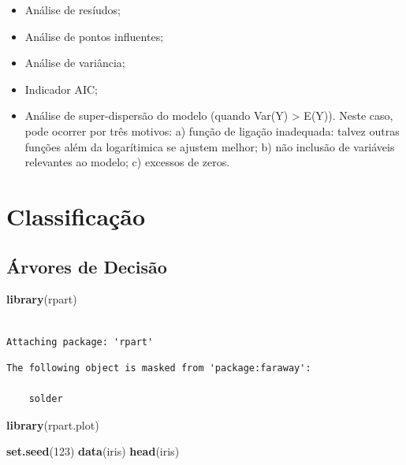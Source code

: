 \documentclass[12pt,brazil,oneside]{book}
\newenvironment{Shaded}{\begin{snugshade}}{\end{snugshade}}
\newcommand{\DecValTok}[1]{\textcolor[rgb]{0.00,0.00,0.81}{#1}}
\newcommand{\KeywordTok}[1]{\textcolor[rgb]{0.13,0.29,0.53}{\textbf{#1}}}
\newcommand{\NormalTok}[1]{#1}
\providecommand{\tightlist}{%
  \setlength{\itemsep}{0pt}\setlength{\parskip}{0pt}}
\begin{document}
\begin{itemize}
\tightlist
\item
  Análise de resíudos;
\item
  Análise de pontos influentes;
\item
  Análise de variância;
\item
  Indicador AIC;
\item
  Análise de super-dispersão do modelo (quando Var(Y) \textgreater{} E(Y)). Neste caso, pode ocorrer por três motivos: a) função de ligação inadequada: talvez outras funções além da logarítimica se ajustem melhor; b) não inclusão de variáveis relevantes ao modelo; c) excessos de zeros.
\end{itemize}

\hypertarget{classificacao}{%
\chapter{Classificação}\label{classificacao}}

\hypertarget{arvores-de-decisao}{%
\section{Árvores de Decisão}\label{arvores-de-decisao}}

\begin{Shaded}
\begin{Highlighting}[]
\KeywordTok{library}\NormalTok{(rpart)}
\end{Highlighting}
\end{Shaded}

\begin{verbatim}

Attaching package: 'rpart'
\end{verbatim}

\begin{verbatim}
The following object is masked from 'package:faraway':

    solder
\end{verbatim}

\begin{Shaded}
\begin{Highlighting}[]
\KeywordTok{library}\NormalTok{(rpart.plot)}

\KeywordTok{set.seed}\NormalTok{(}\DecValTok{123}\NormalTok{)}
\KeywordTok{data}\NormalTok{(iris)}
\KeywordTok{head}\NormalTok{(iris)}
\end{Highlighting}
\end{Shaded}
\end{document}
